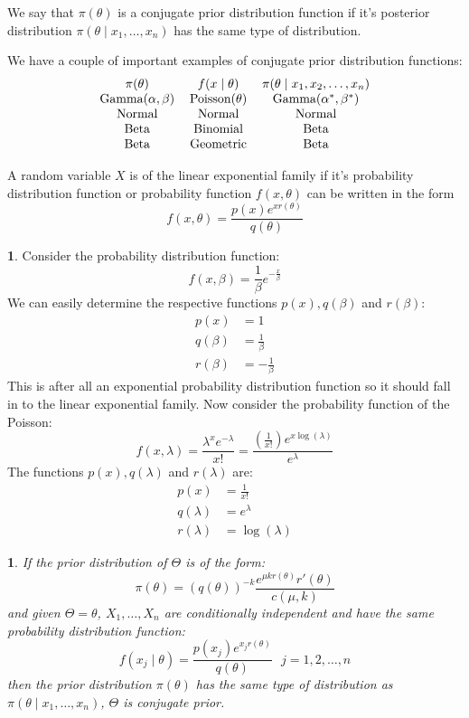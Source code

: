 \documentclass[english,12pt]{article}
\theoremstyle{plain}
\newtheorem*{theorem}{\protect\theoremname}
\theoremstyle{definition}
\newtheorem*{example}{\protect\examplename}
\theoremstyle{definition} %
\providecommand{\theoremname}{Theorem}
\providecommand{\examplename}{Example}
\begin{document}
We say that $\pi(\theta)$ is a conjugate prior distribution function if it's posterior distribution $\pi(\theta\mid x_1,\ldots,x_n)$ has the same type of distribution.

We have a couple of important examples of conjugate prior distribution functions:
\[\begin{tabular}{ccc}
$\pi(\theta)$ & $f(x\mid\theta)$ & $\pi(\theta\mid x_1,x_2,\ldots, x_n)$\\
Gamma$(\alpha,\beta)$ & Poisson$(\theta)$ & Gamma$(\alpha^\ast,\beta^\ast)$\\
Normal & Normal & Normal\\
Beta & Binomial & Beta\\
Beta & Geometric & Beta
\end{tabular}
\]

A random variable $X$ is of the linear exponential family if it's probability distribution function or probability function $f(x,\theta)$ can be written in the form
\[f(x,\theta)=\frac{p(x)e^{xr(\theta)}}{q(\theta)}\]

\begin{example}
Consider the probability distribution function:
\[f(x,\beta)=\frac{1}{\beta}e^{-\frac{x}{\beta}}\]
We can easily determine the respective functions $p(x),q(\beta)$ and $r(\beta)$:
\begin{align*}
p(x)&=1\\
q(\beta)&=\frac{1}{\beta}\\
r(\beta)&=-\frac{1}{\beta}
\end{align*}
This is after all an exponential probability distribution function so it should fall in to the linear exponential family.  Now consider the probability function of the Poisson:
\[f(x,\lambda)=\frac{\lambda^xe^{-\lambda}}{x!}=\frac{\left(\frac{1}{x!}\right)e^{x\log(\lambda)}}{e^\lambda}\]
The functions $p(x),q(\lambda)$ and $r(\lambda)$ are:
\begin{align*}
p(x)&=\frac{1}{x!}\\
q(\lambda)&=e^\lambda\\
r(\lambda)&=\log(\lambda)
\end{align*}
\end{example}

\begin{theorem}
If the prior distribution of $\Theta$ is of the form:
\[\pi(\theta)=\left(q(\theta)\right)^{-k}\frac{e^{\mu kr(\theta)}r'(\theta)}{c(\mu,k)}\]
and given $\Theta=\theta$, $X_1,\ldots,X_n$ are conditionally independent and have the same probability distribution function:
\[f(x_j\mid\theta)=\frac{p(x_j)e^{x_jr(\theta)}}{q(\theta)}\text{ }j=1,2,\ldots,n\]
then the prior distribution $\pi(\theta)$ has the same type of distribution as $\pi(\theta\mid x_1,\ldots,x_n)$, $\Theta$ is conjugate prior.
\end{theorem}
\end{document}

